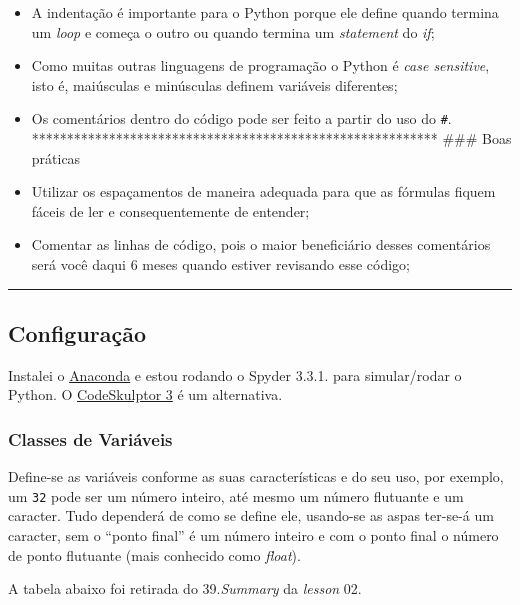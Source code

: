 \documentclass[]{book}
\begin{document}
\begin{itemize}
\item
  A indentação é importante para o Python porque ele define quando
  termina um \emph{loop} e começa o outro ou quando termina um
  \emph{statement} do \emph{if};
\item
  Como muitas outras linguagens de programação o Python é \emph{case
  sensitive}, isto é, maiúsculas e minúsculas definem variáveis
  diferentes;
\item
  Os comentários dentro do código pode ser feito a partir do uso do
  \texttt{\#}.
  ********************************************************** \#\#\# Boas
  práticas
\item
  Utilizar os espaçamentos de maneira adequada para que as fórmulas
  fiquem fáceis de ler e consequentemente de entender;
\item
  Comentar as linhas de código, pois o maior beneficiário desses
  comentários será você daqui 6 meses quando estiver revisando esse
  código;
\end{itemize}

\begin{center}\rule{0.5\linewidth}{\linethickness}\end{center}

\subsection{Configuração}\label{configuracao}

Instalei o \href{https://www.anaconda.com/download/}{Anaconda} e estou
rodando o Spyder 3.3.1. para simular/rodar o Python. O
\href{https://py3.codeskulptor.org}{CodeSkulptor 3} é um alternativa.

\subsubsection{Classes de Variáveis}\label{classes-de-variaveis}

Define-se as variáveis conforme as suas características e do seu uso,
por exemplo, um \texttt{32} pode ser um número inteiro, até mesmo um
número flutuante e um caracter. Tudo dependerá de como se define ele,
usando-se as aspas ter-se-á um caracter, sem o ``ponto final'' é um
número inteiro e com o ponto final o número de ponto flutuante (mais
conhecido como \emph{float}).

A tabela abaixo foi retirada do 39.\emph{Summary} da \emph{lesson} 02.
\end{document}
